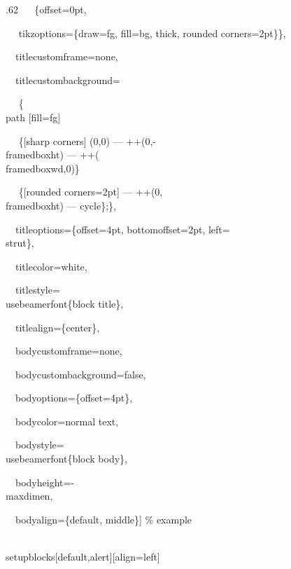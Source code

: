 \documentclass[8pt, utf8, a4paper, handout]{beamer}
\begin{document}
\begin{frame}
\begin{columns}[t]
\begin{column}{.62\hsize}
      ~~  \{offset=0pt,                                                              \par
      ~~   tikzoptions=\{draw=fg, fill=bg, thick, rounded corners=2pt\}\},           \par
      ~~titlecustomframe=none,                                                       \par
      ~~titlecustombackground=                                                       \par
      ~~  \{\\path [fill=fg]                                                         \par
      ~~  \{[sharp corners] (0,0) --- ++(0,-\\framedboxht) --- ++(\\framedboxwd,0)\} \par
      ~~  \{[rounded corners=2pt] --- ++(0,\\framedboxht)  --- cycle\};\},           \par
      ~~titleoptions=\{offset=4pt, bottomoffset=2pt, left=\\strut\},                 \par
      ~~titlecolor=white,                                                            \par
      ~~titlestyle=\\usebeamerfont\{block title\},                                   \par
      ~~titlealign=\{center\},                                                       \par
      ~~bodycustomframe=none,                                                        \par
      ~~bodycustombackground=false,                                                  \par
      ~~bodyoptions=\{offset=4pt\},                                                  \par
      ~~bodycolor=normal text,                                                       \par
      ~~bodystyle=\\usebeamerfont\{block body\},                                     \par
      ~~bodyheight=-\\maxdimen,                                                      \par
      ~~bodyalign=\{default, middle\}]
      \blank[line]
      \% example                                                                     \par
      \\setupblocks[default,alert][align=left]
      \egroup
    \end{column}
  \end{columns}

\end{frame}
\end{document}
